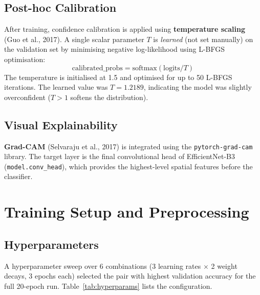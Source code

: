 \documentclass[12pt,a4paper]{article}
\begin{document}
\subsection{Post-hoc Calibration}

After training, confidence calibration is applied using \textbf{temperature scaling} (Guo et al., 2017). A single scalar parameter $T$ is \emph{learned} (not set manually) on the validation set by minimising negative log-likelihood using L-BFGS optimisation:
\[
    \text{calibrated\_probs} = \text{softmax}(\text{logits} / T)
\]
The temperature is initialised at 1.5 and optimised for up to 50 L-BFGS iterations. The learned value was $T = 1.2189$, indicating the model was slightly overconfident ($T > 1$ softens the distribution).

\subsection{Visual Explainability}

\textbf{Grad-CAM} (Selvaraju et al., 2017) is integrated using the \texttt{pytorch-grad-cam} library. The target layer is the final convolutional head of EfficientNet-B3 (\texttt{model.conv\_head}), which provides the highest-level spatial features before the classifier.

\section{Training Setup and Preprocessing}

\subsection{Hyperparameters}

A hyperparameter sweep over 6 combinations (3 learning rates $\times$ 2 weight decays, 3 epochs each) selected the pair with highest validation accuracy for the full 20-epoch run. Table~\ref{tab:hyperparams} lists the configuration.
\end{document}
